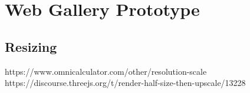 \section{Web Gallery Prototype}
\subsection{Resizing} 
https://www.omnicalculator.com/other/resolution-scale
https://discourse.threejs.org/t/render-half-size-then-upscale/13228